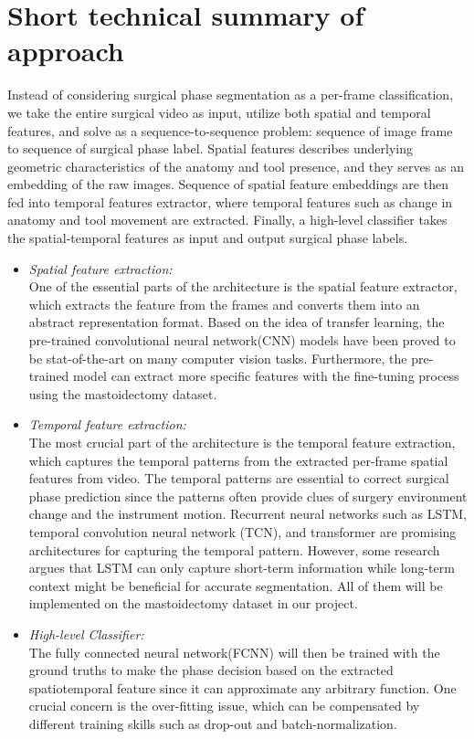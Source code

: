 \documentclass[11pt]{article} \usepackage[top=1in, bottom=1in, left=1in, right=1in]{geometry}
\begin{document}
\section{Short technical summary of approach}
Instead of considering surgical phase segmentation as a per-frame classification, we take the entire surgical video as input, utilize both spatial and temporal features, and solve as a sequence-to-sequence problem: sequence of image frame to sequence of surgical phase label. Spatial features describes underlying geometric characteristics of the anatomy and tool presence, and they serves as an embedding of the raw images. Sequence of spatial feature embeddings are then fed into temporal features extractor, where temporal features such as change in anatomy and tool movement are extracted. Finally, a high-level classifier takes the spatial-temporal features as input and output surgical phase labels.
\begin{itemize}
    \item \textit{Spatial feature extraction:}\\
    One of the essential parts of the architecture is the spatial feature extractor, which extracts the feature from the frames and converts them into an abstract representation format. Based on the idea of transfer learning, the pre-trained convolutional neural network(CNN) models have been proved to be stat-of-the-art on many computer vision tasks. Furthermore, the pre-trained model can extract more specific features with the fine-tuning process using the mastoidectomy dataset. 
    \item \textit{Temporal feature extraction:}\\
   The most crucial part of the architecture is the temporal feature extraction, which captures the temporal patterns from the extracted per-frame spatial features from video. The temporal patterns are essential to correct surgical phase prediction since the patterns often provide clues of surgery environment change and the instrument motion. Recurrent neural networks such as LSTM, temporal convolution neural network (TCN), and transformer are promising architectures for capturing the temporal pattern. However, some research argues that LSTM can only capture short-term information while long-term context might be beneficial for accurate segmentation. All of them will be implemented on the mastoidectomy dataset in our project.
   \item \textit{High-level Classifier:}\\
   The fully connected neural network(FCNN) will then be trained with the ground truths to make the phase decision based on the extracted spatiotemporal feature since it can approximate any arbitrary function. One crucial concern is the over-fitting issue, which can be compensated by different training skills such as drop-out and batch-normalization. 
\end{itemize}
\end{document}
